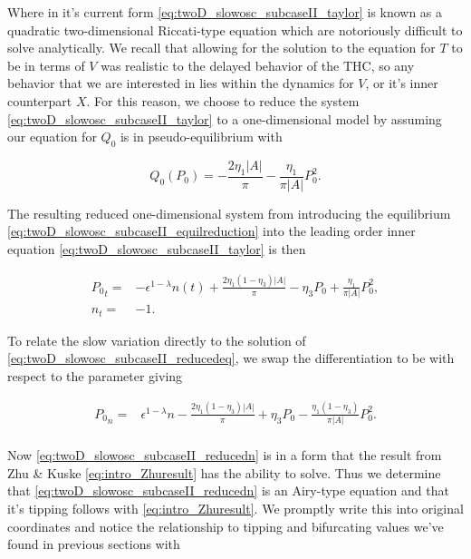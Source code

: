 Where in it's current form \eqref{eq:twoD_slowosc_subcaseII_taylor} is known as a quadratic two-dimensional Riccati-type equation which are notoriously difficult to solve analytically. We recall that allowing for the solution to the equation for $T$ to be in terms of $V$ was realistic to the delayed behavior of the THC, so any behavior that we are interested in lies within the dynamics for $V$, or it's inner counterpart $X$. For this reason, we choose to reduce the system \eqref{eq:twoD_slowosc_subcaseII_taylor} to a one-dimensional model by assuming our equation for $Q_0$ is in pseudo-equilibrium with 

\begin{equation}\label{eq:twoD_slowosc_subcaseII_equilreduction}
{Q_0}(P_0) =  -\frac{2\eta_1|A|}{\pi}-\frac{\eta_1}{\pi|A|}P_0^2.
\end{equation}

The resulting reduced one-dimensional system from introducing the equilibrium \eqref{eq:twoD_slowosc_subcaseII_equilreduction} into the leading order inner equation \eqref{eq:twoD_slowosc_subcaseII_taylor} is then

\begin{equation}\label{eq:twoD_slowosc_subcaseII_reducedeq}
\begin{aligned}
{P_0}_t =& -\epsilon^{1-\lambda}n(t)+\frac{2\eta_1(1-\eta_3)|A|}{\pi}-\eta_3P_0+\frac{\eta_1}{\pi|A|}P_0^2,\\
n_t=&-1.
\end{aligned}
\end{equation}

To relate the slow variation directly to the solution of \eqref{eq:twoD_slowosc_subcaseII_reducedeq}, we swap the differentiation to be with respect to the parameter giving 

\begin{equation} \label{eq:twoD_slowosc_subcaseII_reducedn}
\begin{aligned}
{P_0}_n =& \epsilon^{1-\lambda} n -\frac{2\eta_1(1-\eta_3)|A|}{\pi}+\eta_3 P_0-\frac{\eta_1(1-\eta_3)}{\pi|A|}P_0^2.\\
\end{aligned}
\end{equation}

Now \eqref{eq:twoD_slowosc_subcaseII_reducedn} is in a form that the result from Zhu \& Kuske \eqref{eq:intro_Zhuresult} has the ability to solve. Thus we determine that \eqref{eq:twoD_slowosc_subcaseII_reducedn} is an Airy-type equation and that it's tipping follows with \eqref{eq:intro_Zhuresult}. We promptly write this into original coordinates and notice the relationship to tipping and bifurcating values we've found in previous sections with

